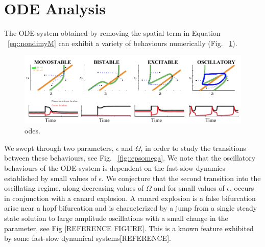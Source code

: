 \section{ODE Analysis}

The ODE system obtained by removing the spatial term in Equation ~\ref{eq::nondimyM} can exhibit a variety of behaviours numerically (Fig. ~\ref{fig::odeanal}). 
\begin{figure}[h]
\centering
\captionsetup{width=\linewidth}
\includegraphics[width=4.5in]{Project2/figs/ODE_Analysis.pdf}
\caption{odes.}
\label{fig::odeanal}
\end{figure}

We swept through two parameters, $\epsilon$ and $\Omega$, in order to study the transitions between these behaviours, see Fig. ~\ref{fig::epsomega}. We note that the oscillatory behaviours of the ODE system is dependent on the fast-slow dynamics established by small values of $\epsilon$. We conjecture that the second transition into the oscillating regime, along decreasing values of $\Omega$ and for small values of $\epsilon$, occurs in conjunction with a canard explosion. A canard explosion is a false bifurcation arise near a hopf bifurcation and is characterized by a jump from a single steady state solution to large amplitude oscillations with a small change in the parameter, see Fig [REFERENCE FIGURE]. This is a known feature exhibited by some fast-slow dynamical systems[REFERENCE].




